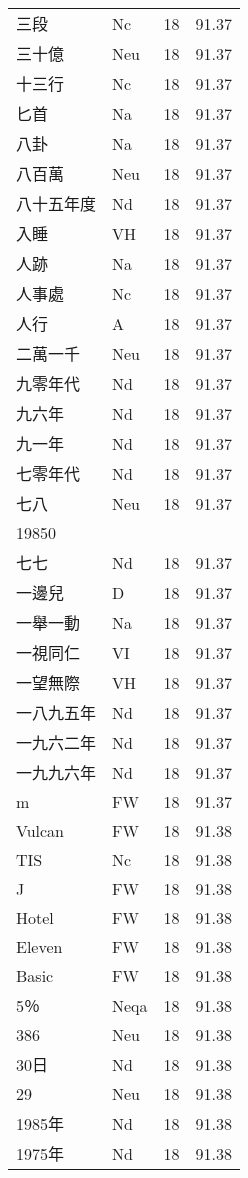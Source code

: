 \documentclass[twocolumn]{book}
\begin{document}
\begin{supertabular}{llrr}
三段 & Nc & 18 &  91.37\\
三十億 & Neu & 18 &  91.37\\
十三行 & Nc & 18 &  91.37\\
匕首 & Na & 18 &  91.37\\
八卦 & Na & 18 &  91.37\\
八百萬 & Neu & 18 &  91.37\\
八十五年度 & Nd & 18 &  91.37\\
入睡 & VH & 18 &  91.37\\
人跡 & Na & 18 &  91.37\\
人事處 & Nc & 18 &  91.37\\
人行 & A & 18 &  91.37\\
二萬一千 & Neu & 18 &  91.37\\
九零年代 & Nd & 18 &  91.37\\
九六年 & Nd & 18 &  91.37\\
九一年 & Nd & 18 &  91.37\\
七零年代 & Nd & 18 &  91.37\\
七八 & Neu & 18 &  91.37\\
19850\\
七七 & Nd & 18 &  91.37\\
一邊兒 & D & 18 &  91.37\\
一舉一動 & Na & 18 &  91.37\\
一視同仁 & VI & 18 &  91.37\\
一望無際 & VH & 18 &  91.37\\
一八九五年 & Nd & 18 &  91.37\\
一九六二年 & Nd & 18 &  91.37\\
一九九六年 & Nd & 18 &  91.37\\
m & FW & 18 &  91.37\\
Vulcan & FW & 18 &  91.38\\
TIS & Nc & 18 &  91.38\\
J & FW & 18 &  91.38\\
Hotel & FW & 18 &  91.38\\
Eleven & FW & 18 &  91.38\\
Basic & FW & 18 &  91.38\\
5％ & Neqa & 18 &  91.38\\
386 & Neu & 18 &  91.38\\
30日 & Nd & 18 &  91.38\\
29 & Neu & 18 &  91.38\\
1985年 & Nd & 18 &  91.38\\
1975年 & Nd & 18 &  91.38\\

\end{supertabular}
\end{document}
